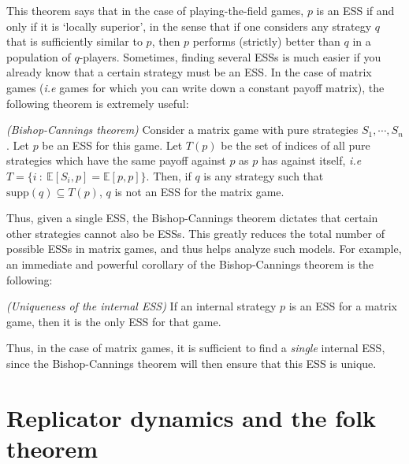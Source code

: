 This theorem says that in the case of playing-the-field games, $p$ is an ESS if and only if it is `locally superior', in the sense that if one considers any strategy $q$ that is sufficiently similar to $p$, then $p$ performs (strictly) better than $q$ in a population of $q$-players.
Sometimes, finding several ESSs is much easier if you already know that a certain strategy must be an ESS. In the case of matrix games (\textit{i.e} games for which you can write down a constant payoff matrix), the following theorem is extremely useful:

\begin{theorem}\emph{(Bishop-Cannings theorem)}
	Consider a matrix game with pure strategies $S_1,\cdots,S_n$. Let $p$ be an ESS for this game. Let $T(p)$ be the set of indices of all pure strategies which have the same payoff against $p$ as $p$ has against itself, \textit{i.e} $T = \{i \ : \ \mathbb{E}[S_i,p]=\mathbb{E}[p,p]\}$. Then, if $q$ is any strategy such that $\textrm{supp}(q) \subseteq T(p)$, $q$ is not an ESS for the matrix game.
\end{theorem}

Thus, given a single ESS, the Bishop-Cannings theorem dictates that certain other strategies cannot also be ESSs. This greatly reduces the total number of possible ESSs in matrix games, and thus helps analyze such models. For example, an immediate and powerful corollary of the Bishop-Cannings theorem is the following:

\begin{corollary}\emph{(Uniqueness of the internal ESS)}
	If an internal strategy $p$ is an ESS for a matrix game, then it is the only ESS for that game.
\end{corollary}

Thus, in the case of matrix games, it is sufficient to find a \textit{single} internal ESS, since the Bishop-Cannings theorem will then ensure that this ESS is unique. 

\section{Replicator dynamics and the folk theorem}

